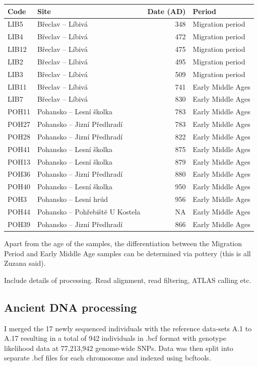 \begin{tabular}{l|l|r|l}
\hline
Code & Site & Date (AD) & Period\\
\hline
LIB5 & Břeclav – Líbivá & 348 & Migration period\\
\hline
LIB4 & Břeclav – Líbivá & 472 & Migration period\\
\hline
LIB12 & Břeclav – Líbivá & 475 & Migration period\\
\hline
LIB2 & Břeclav – Líbivá & 495 & Migration period\\
\hline
LIB3 & Břeclav – Líbivá & 509 & Migration period\\
\hline
LIB11 & Břeclav – Líbivá & 741 & Early Middle Ages\\
\hline
LIB7 & Břeclav – Líbivá & 830 & Early Middle Ages\\
\hline
POH11 & Pohansko – Lesní školka & 783 & Early Middle Ages\\
\hline
POH27 & Pohansko – Jizní Předhradí & 783 & Early Middle Ages\\
\hline
POH28 & Pohansko – Jizní Předhradí & 822 & Early Middle Ages\\
\hline
POH41 & Pohansko – Lesní školka & 875 & Early Middle Ages\\
\hline
POH13 & Pohansko – Lesní školka & 879 & Early Middle Ages\\
\hline
POH36 & Pohansko – Jizní Předhradí & 880 & Early Middle Ages\\
\hline
POH40 & Pohansko – Lesní školka & 950 & Early Middle Ages\\
\hline
POH3 & Pohansko – Lesní hrúd & 956 & Early Middle Ages\\
\hline
POH44 & Pohansko – Pohřebištĕ U Kostela & NA & Early Middle Ages\\
\hline
POH39 & Pohansko – Jizní Předhradí & 866 & Early Middle Ages\\
\hline
\end{tabular}

Apart from the age of the samples, the differentiation between the Migration Period and Early Middle Age samples can be determined via pottery (this is all Zuzana said).  

Include details of processing. Read alignment, read filtering, ATLAS calling etc. 

\subsection{Ancient DNA processing}

I merged the 17 newly sequenced individuals with the reference data-sets A.1 to A.17 resulting in a total of 942 individuals in .bcf format with genotype likelihood data at 77,213,942 genome-wide SNPs. Data was then split into separate .bcf files for each chromosome and indexed using bcftools.

